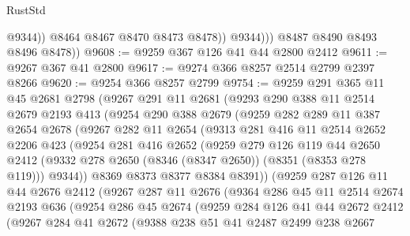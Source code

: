 \begin{lexlean}{RustStd}
\begin{coremodule}
{\begin{coremodule}
{{{{{{{{{{{{{{{{{{{{{{{{{{{{{{{{{{{{{{{{{{{{{{{{{{                      @9344))
                  @8464
                  @8467
                  @8470
                  @8473
                  @8478))
              @9344)))
        @8487
        @8490
        @8493
        @8496
        @8478))
@9608 := @9259 @367 @126 @41 @44 @2800 @2412
@9611 := @9267 @367 @41 @2800
@9617 := @9274 @366 @8257 @2514 @2799 @2397 @8266
@9620 := @9254 @366 @8257 @2799
@9754 := @9259
    @291
    @365
    @11
    @45
    @2681
    @2798
    (@9267
      @291
      @11
      @2681
      (@9293
        @290
        @388
        @11
        @2514
        @2679
        @2193
        @413
        (@9254
          @290
          @388
          @2679
          (@9259
            @282
            @289
            @11
            @387
            @2654
            @2678
            (@9267
              @282
              @11
              @2654
              (@9313
                @281
                @416
                @11
                @2514
                @2652
                @2206
                @423
                (@9254
                  @281
                  @416
                  @2652
                  (@9259
                    @279
                    @126
                    @119
                    @44
                    @2650
                    @2412
                    (@9332 @278 @2650 (@8346 (@8347 @2650)) (@8351 (@8353 @278 @119)))
                    @9344))
                @8369
                @8373
                @8377
                @8384
                @8391))
            (@9259
              @287
              @126
              @11
              @44
              @2676
              @2412
              (@9267
                @287
                @11
                @2676
                (@9364
                  @286
                  @45
                  @11
                  @2514
                  @2674
                  @2193
                  @636
                  (@9254
                    @286
                    @45
                    @2674
                    (@9259
                      @284
                      @126
                      @41
                      @44
                      @2672
                      @2412
                      (@9267
                        @284
                        @41
                        @2672
                        (@9388
                          @238
                          @51
                          @41
                          @2487
                          @2499
                          @238
                          @2667
}}}}}}}}}}}}}}}}}}}}}}}}}}}}}}}}}}}}}}}}}}}}}}}}}}
\end{coremodule}}
\end{coremodule}
\end{lexlean}
